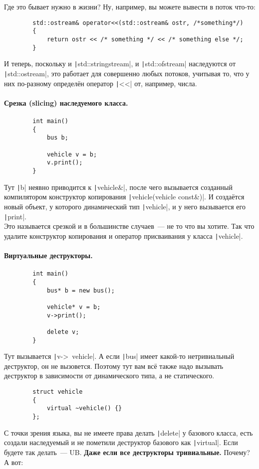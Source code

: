 \documentclass{article}
\begin{document}
    Где это бывает нужно в жизни? Ну, например, вы можете вывести в поток что-то:
    \begin{verbatim}
        std::ostream& operator<<(std::ostream& ostr, /*something*/)
        {
            return ostr << /* something */ << /* something else */;
        }
    \end{verbatim}
    И теперь, поскольку и \texttt|std::stringstream|, и \texttt|std::ofstream| наследуются от \texttt|std::ostream|, это работает для совершенно любых потоков, учитывая то, что у них по-разному определён оператор \texttt|<<| от, например, числа.
    \paragraph{Срезка (slicing) наследуемого класса.}
    \label{par:slicing}
    \begin{verbatim}
        int main()
        {
            bus b;

            vehicle v = b;
            v.print();
        }
    \end{verbatim}
    Тут \texttt|b| неявно приводится к \texttt|vehicle&|, после чего вызывается созданный компилятором конструктор копирования \texttt|vehicle(vehicle const&)|. И создаётся новый объект, у которого динамический тип \texttt|vehicle|, и у него вызывается его \texttt|print|.\\
    Это называется срезкой и в большинстве случаев~--- не то что вы хотите. Так что удалите конструктор копирования и оператор присваивания у класса \texttt|vehicle|.
    \paragraph{Виртуальные деструкторы.}
    \begin{verbatim}
        int main()
        {
            bus* b = new bus();

            vehicle* v = b;
            v->print();
            
            delete v;
        }
    \end{verbatim}
    Тут вызывается \texttt|v->~vehicle|. А если \texttt|bus| имеет какой-то нетривиальный деструктор, он не вызовется. Поэтому тут вам всё также надо вызывать деструктор в зависимости от динамического типа, а не статического.
    \begin{verbatim}
        struct vehicle
        {
            virtual ~vehicle() {}
        };
    \end{verbatim}
    С точки зрения языка, вы не имеете права делать \texttt|delete| у базового класса, есть создали наследуемый и не пометили деструктор базового как \texttt|virtual|. Если будете так делать~--- UB. \textbf{Даже если все деструкторы тривиальные.} Почему? А вот:
\end{document}
